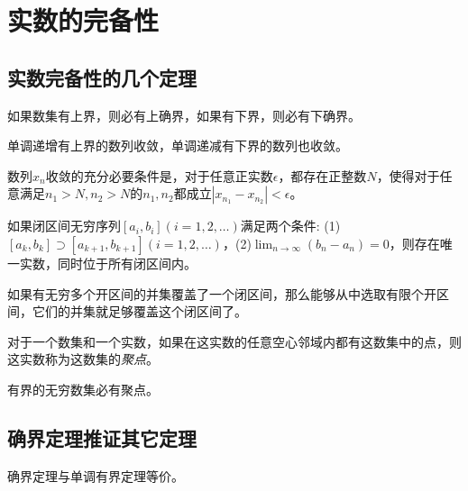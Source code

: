
\section{实数的完备性}
\label{sec:completeness-of-real-number}

\subsection{实数完备性的几个定理}

\begin{theorem}[确界定理]
  如果数集有上界，则必有上确界，如果有下界，则必有下确界。
\end{theorem}

\begin{theorem}[单调有界定理]
  单调递增有上界的数列收敛，单调递减有下界的数列也收敛。
\end{theorem}

\begin{theorem}[柯西收敛准则]
  数列$x_n$收敛的充分必要条件是，对于任意正实数$\epsilon$，都存在正整数$N$，使得对于任意满足$n_1>N,n_2>N$的$n_1,n_2$都成立$|x_{n_1}-x_{n_2}| < \epsilon$。
\end{theorem}

\begin{theorem}[闭区间套定理]
  如果闭区间无穷序列$[a_i,b_i](i=1,2,\ldots)$满足两个条件: (1)$[a_k,b_k]\supset[a_{k+1},b_{k+1}](i=1,2,\ldots)$，(2)$\lim_{n\to\infty}(b_n-a_n)=0$，则存在唯一实数，同时位于所有闭区间内。
\end{theorem}

\begin{theorem}[有限覆盖定理]
  如果有无穷多个开区间的并集覆盖了一个闭区间，那么能够从中选取有限个开区间，它们的并集就足够覆盖这个闭区间了。
\end{theorem}

\begin{definition}
  对于一个数集和一个实数，如果在这实数的任意空心邻域内都有这数集中的点，则这实数称为这数集的\emph{聚点}。
\end{definition}

\begin{theorem}
  有界的无穷数集必有聚点。
\end{theorem}

\subsection{确界定理推证其它定理}

\begin{theorem}
  确界定理与单调有界定理等价。
\end{theorem}

